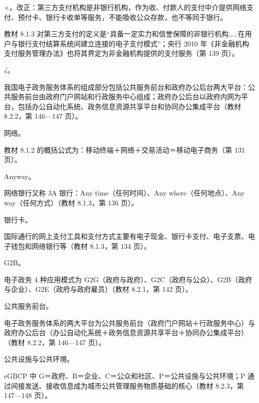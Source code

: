 \documentclass[a4paper,11pt]{article}
\begin{document}
\q ×。改正：第三方支付机构是非银行机构，作为收、付款人的支付中介提供网络支付、预付卡、银行卡收单等服务，不能吸收公众存款，也不等同于银行。\begin{analysis}教材 8.1.3 对第三方支付的定义是“具备一定实力和信誉保障的非银行机构……在用户与银行支付结算系统间建立连接的电子支付模式”；央行 2010 年《非金融机构支付服务管理办法》也将其界定为非金融机构提供的支付服务（第 139 页）。\end{analysis}

\q √。\begin{analysis}我国电子政务服务体系的组成部分包括公共服务前台和政府办公后台两大平台：公共服务前台由政府门户网站和行政服务中心组成；政府办公后台以政府内网为平台，包括办公自动化系统、政务信息资源共享平台和协同办公集成平台（教材 8.2.2，第 146—147 页）。\end{analysis}


\q 网络。\begin{analysis}教材 8.1.2 的概括公式为：移动终端＋网络＋交易活动＝移动电子商务（第 131 页）。\end{analysis}

\q Anyway。\begin{analysis}网络银行又称 3A 银行：Any time（任何时间）、Any where（任何地点）、Any way（任何方式）（教材 8.1.3，第 136 页）。\end{analysis}

\q 银行卡。\begin{analysis}国际通行的网上支付工具和支付方式主要有电子现金、银行卡支付、电子支票、电子钱包和网络银行等（教材 8.1.3，第 134 页）。\end{analysis}

\q G2B。\begin{analysis}电子政务 4 种应用模式为 G2G（政府与政府）、G2C（政府与公众）、G2B（政府与企业）、G2E（政府与政府雇员）（教材 8.2.1，第 142 页）。\end{analysis}

\q 公共服务前台。\begin{analysis}电子政务服务体系的两大平台为公共服务前台（政府门户网站＋行政服务中心）与政府办公后台（办公自动化系统＋政务信息资源共享平台＋协同办公集成平台）（教材 8.2.2，第 146—147 页）。\end{analysis}

\q 公共设施与公共环境。\begin{analysis}eGBCP 中 G＝政府、B＝企业、C＝公众和社区、P＝公共设施与公共环境；P 通过间接发送、接收信息成为城市公共管理服务物质基础的核心（教材 8.2.3，第 147—148 页）。\end{analysis}
\end{document}
